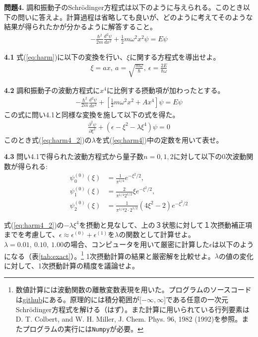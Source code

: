 \documentclass[11pt,pra,aps]{revtex4}
\begin{document}
\noindent
{\bf 問題4.} 調和振動子のSchr\"odinger方程式は以下のように与えられる。このとき以下の問いに答えよ。計算過程は省略しても良いが、どのように考えてそのような結果が得られたかが分かるように解答すること。
\begin{align}
  -\frac{\hbar^2}{2m}\frac{d^2\psi}{dx^2}+\frac{1}{2}m\omega^2x^2\psi=E\psi \label{eq:harm}
\end{align}

\noindent
{\bf 4.1} 式(\ref{eq:harm})に以下の変換を行い、$\xi$に関する方程式を導出せよ。
\begin{align}
  \xi=ax,\ a=\sqrt{\frac{m\omega}{\hbar}},\ \epsilon=\frac{2E}{\hbar\omega}
\end{align}

\noindent
{\bf 4.2} 調和振動子の波動方程式に$x^4$に比例する摂動項が加わったとする。
\begin{align}
  -\frac{\hbar^2}{2m}\frac{d^2\psi}{dx^2}+\left[\frac{1}{2}m\omega^2x^2+Ax^4\right]\psi=E\psi \label{eq:harm4}
\end{align}
この式に問い4.1と同様な変換を施して以下の式を得た。
\begin{align}
  \frac{\partial^2\psi}{\partial \xi^2}+(\epsilon-\xi^2-\lambda\xi^4)\psi=0 \label{eq:harm4_2}
\end{align}
このとき式(\ref{eq:harm4_2})の$\lambda$を式(\ref{eq:harm4})中の定数を用いて表せ。

\noindent
{\bf 4.3} 問い4.1で得られた波動方程式から量子数$n=0,1,2$に対して以下の0次波動関数が得られる:
\begin{align}
  \psi_0^{(0)}(\xi)&=\frac{1}{\pi^{1/4}} e^{-\xi^2/2}, \\
  \psi_1^{(0)}(\xi)&=\frac{2}{\pi^{1/4}2^{1/2}} \xi e^{-\xi^2/2}, \\
  \psi_2^{(0)}(\xi)&=\frac{1}{\pi^{1/4}2\cdot 2^{1/2}} (4\xi^2-2)e^{-\xi^2/2}
\end{align}

式(\ref{eq:harm4_2})の$-\lambda\xi^4$を摂動と見なして、上の３状態に対して１次摂動補正項までを考慮して、$\epsilon\approx\epsilon^{(0)}+\epsilon^{(1)}$を$\lambda$の関数として計算せよ。$\lambda=0.01,\ 0.10,\ 1.00$の場合、コンピュータを用いて厳密に計算した$\epsilon$は以下のようになる（表\ref{tab:exact}）。\footnote{数値計算には波動関数の離散変数表現を用いた。プログラムのソースコードは\href{https://github.com/msaitow/okiba/blob/main/dvr-anharmonic.py}
 {github}にある。原理的には積分範囲が[$-\infty,\infty$]である任意の一次元Schr\"odinger方程式を解ける（はず）。また計算に用いられている行列要素はD. T. Colbert, and W. H. Miller, J. Chem. Phys. 96, 1982 (1992)を参照。またプログラムの実行には{\tt Numpy}が必要。} 1次摂動計算の結果と厳密解を比較せよ。$\lambda$の値の変化に対して、1次摂動計算の精度を議論せよ。
\end{document}
